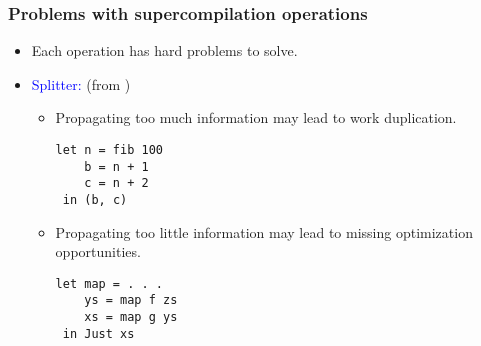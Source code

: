 \documentclass{beamer}
\begin{document}
\begin{frame}[fragile]
    \frametitle{Problems with supercompilation operations}

    \begin{itemize}[<+->]
        \item[]
            Each operation has hard problems to solve.

        \item[]
            \textcolor{blue}{Splitter:}
            (from \citet{callbyneed-sc})
            \begin{itemize}
                \item[]
                    Propagating too much information may lead to work
                    duplication.

                    \begin{verbatim}
let n = fib 100
    b = n + 1
    c = n + 2
 in (b, c)
                    \end{verbatim}

                \item[]
                    Propagating too little information may lead to missing
                    optimization opportunities.
                    \begin{verbatim}
let map = . . .
    ys = map f zs
    xs = map g ys
 in Just xs
                    \end{verbatim}
            \end{itemize}


    \end{itemize}
\end{frame}
\end{document}
